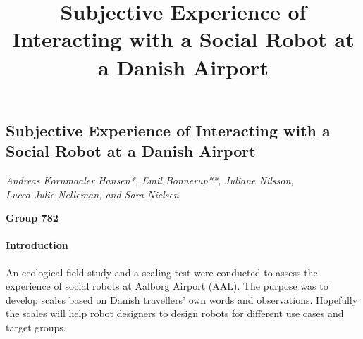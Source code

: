\documentclass[a4paper]{article}
\title{Subjective Experience of Interacting with a Social Robot at a Danish Airport}
\begin{document}
{\centering 
\subsection*{Subjective Experience of Interacting with a Social Robot at a Danish Airport}}

{\centering
\textit{Andreas Kornmaaler Hansen*, Emil Bonnerup**, Juliane Nilsson, \\
Lucca Julie Nelleman, and Sara Nielsen}
\par}

{\centering
\textbf{Group 782}
\par}


\bigskip

\paragraph{Introduction}
An ecological field study and a scaling test were conducted to assess the experience of social robots at Aalborg Airport (AAL). The purpose was to develop scales based on Danish travellers' own words and observations. Hopefully the scales will help robot designers to design robots for different use cases and target groups. 
\end{document}
